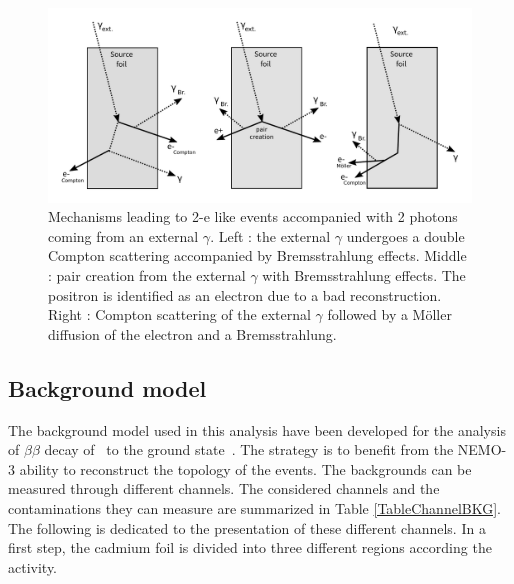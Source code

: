 \documentclass[main.tex]{subfiles}
\begin{document}
\begin{figure}[h!]
\begin{center}
\includegraphics[scale=0.48]{pictures/Chap6/ExternalBkg.pdf}
\end{center}
\caption{Mechanisms leading to 2-e like events accompanied with 2 photons coming from an external $\gamma$. Left : the external $\gamma$ undergoes a double Compton scattering accompanied by Bremsstrahlung effects. Middle : pair creation from the external $\gamma$ with Bremsstrahlung effects. The positron is identified as an electron due to a bad reconstruction. Right : Compton scattering of the external $\gamma$ followed by a M\"oller diffusion of the electron and a Bremsstrahlung.}
\label{ExternalBkgPicture}
\end{figure}


\FloatBarrier


\subsection{Background model}\label{sec:BkgModel}


\NI The background model used in this analysis have been developed for the analysis of $\beta\beta$ decay of \Cd~to the ground state~\cite{Arnold2016bed}. The strategy is to benefit from the NEMO-3 ability to reconstruct the topology of the events. The backgrounds can be measured through different channels. The considered channels and the contaminations they can measure are summarized in Table \ref{TableChannelBKG}. The following is dedicated to the presentation of these different channels. In a first step, the cadmium foil is divided into three different regions according the activity. 
\end{document}
